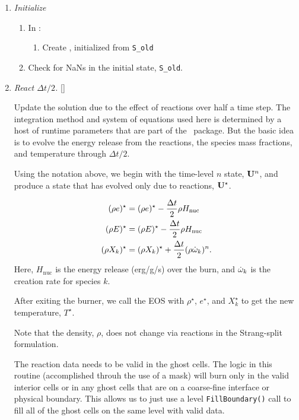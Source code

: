 \begin{enumerate}
\item \label{strang:init} {\em Initialize}

  \begin{enumerate}
  \item In  :
    \begin{enumerate}
    \item Create , initialized from {\tt S\_old}
    \end{enumerate}

  \item Check for NaNs in the initial state, {\tt S\_old}.
  \end{enumerate}

\item {\em React $\Delta t/2$.} []

  Update the solution due to the effect of reactions over half a time
  step.  The integration method and system of equations used here is
  determined by a host of runtime parameters that are part of the
  \microphysics\ package.  But the basic idea is to evolve the energy
  release from the reactions, the species mass fractions, and
  temperature through $\Delta t/2$.

  Using the notation above, we begin with the time-level $n$ state,
  ${\bf U}^n$, and produce a state that has evolved only due to reactions,
  ${\bf U}^\star$.

  \begin{align}
    (\rho e)^\star &= (\rho e)^\star - \frac{\Delta t}{2} \rho H_\mathrm{nuc} \\
    (\rho E)^\star &= (\rho E)^\star - \frac{\Delta t}{2} \rho H_\mathrm{nuc} \\
    (\rho X_k)^\star &= (\rho X_k)^\star + \frac{\Delta t}{2}(\rho\dot\omega_k)^n.
  \end{align}
  Here, $H_\mathrm{nuc}$ is the energy release (erg/g/s) over the
  burn, and $\dot\omega_k$ is the creation rate for species $k$.

  After exiting the burner, we call the EOS with $\rho^\star$,
  $e^\star$, and $X_k^\star$ to get the new temperature, $T^\star$.

  Note that the density, $\rho$, does not change via reactions in the
  Strang-split formulation.

  The reaction data needs to be valid in the ghost cells.  The logic
  in this routine (accomplished throuh the use of a mask) will burn
  only in the valid interior cells or in any ghost cells that are on a
  coarse-fine interface or physical boundary.  This allows us to just
  use a level {\tt FillBoundary()} call to fill all of the ghost cells
  on the same level with valid data.


\end{enumerate}
